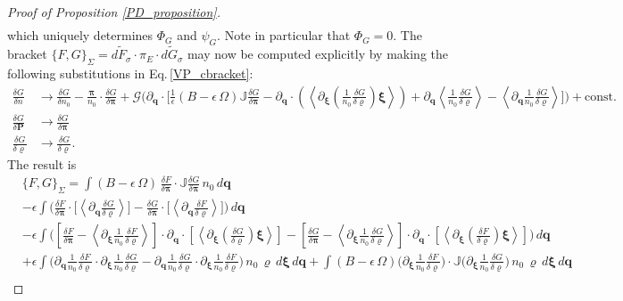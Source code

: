 \documentclass[10pt,a4paper]{amsart}
\begin{document}
\begin{proof}[Proof of Proposition \ref{PD_proposition}]
\begin{align*}
\end{align*}
which uniquely determines $\Phi_G$ and $\psi_G$. Note in particular that $\Phi_G = 0$. The bracket $\{F,G\}_\Sigma = \widetilde{dF_\sigma}\cdot\pi_E\cdot\widetilde{dG_\sigma}$ may now be computed explicitly by making the following substitutions in Eq.\,\eqref{VP_cbracket}:
\begin{align*}
\frac{\delta G}{\delta n}&\rightarrow \frac{\delta G}{\delta n_0} -\frac{\bm{\pi}}{n_0}\cdot\frac{\delta G}{\delta\bm{\pi}} + \mathcal{G}\bigg(\partial_{\bm{q}}\cdot\bigg[\frac{1}{\epsilon}(B-\epsilon\,\Omega)\mathbb{J}\frac{\delta G}{\delta\bm{\pi}} - \partial_{\bm{q}}\cdot\left(\left\langle\partial_{\bm{\xi}}\left(\frac{1}{n_0}\frac{\delta G}{\delta\varrho}\right)\bm{\xi}\right\rangle\right) + \partial_{\bm{q}}\left\langle\frac{1}{n_0}\frac{\delta G}{\delta \varrho}\right\rangle - \left\langle\partial_{\bm{q}}\frac{1}{n_0}\frac{\delta G}{\delta\varrho}\right\rangle\bigg]\bigg)+\text{const.}\\
\frac{\delta G}{\delta\bm{P}}&\rightarrow \frac{\delta G}{\delta\bm{\pi}}\\
\frac{\delta G}{\delta\varrho} & \rightarrow\frac{\delta G}{\delta\varrho}.
\end{align*}
The result is
\begin{align}
&\{F,G\}_{\Sigma} = \int (B-\epsilon\,\Omega)\,\frac{\delta F}{\delta\bm{\pi}}\cdot \mathbb{J}\frac{\delta G}{\delta\bm{\pi}} \,n_0\,d\bm{q} \nonumber\\
%
&-\epsilon\int\bigg(\frac{\delta F}{\delta\bm{\pi}}\cdot \bigg[    \left\langle\partial_{\bm{q}}\frac{\delta G}{\delta\varrho}\right\rangle\bigg]-\frac{\delta G}{\delta\bm{\pi}}\cdot \bigg[  \left\langle\partial_{\bm{q}}\frac{\delta F}{\delta\varrho}\right\rangle\bigg]\bigg)\,d\bm{q}\nonumber\\
&- \epsilon \int \bigg(\left[\frac{\delta F}{\delta\bm{\pi}} - \left\langle\partial_{\bm{\xi}}\frac{1}{n_0}\frac{\delta F}{\delta\varrho}\right\rangle\right]\cdot\partial_{\bm{q}}\cdot\left[\left\langle\partial_{\bm{\xi}}\left(\frac{\delta G}{\delta\varrho}\right)\bm{\xi}\right\rangle\right] -\left[\frac{\delta G}{\delta\bm{\pi}} - \left\langle\partial_{\bm{\xi}}\frac{1}{n_0}\frac{\delta G}{\delta\varrho}\right\rangle\right]\cdot\partial_{\bm{q}}\cdot\left[\left\langle\partial_{\bm{\xi}}\left(\frac{\delta F}{\delta\varrho}\right)\bm{\xi}\right\rangle\right] \bigg)\,d\bm{q}\nonumber\\
&+\epsilon\int \bigg(\partial_{\bm{q}}\frac{1}{n_0}\frac{\delta F}{\delta \varrho}\cdot \partial_{\bm{\xi}}\frac{1}{n_0}\frac{\delta G}{\delta\varrho} -\partial_{\bm{q}}\frac{1}{n_0}\frac{\delta G}{\delta \varrho}\cdot \partial_{\bm{\xi}}\frac{1}{n_0}\frac{\delta F}{\delta\varrho} \bigg)\,n_0\,\varrho\,d\bm{\xi}\,d\bm{q} + \int (B-\epsilon\,\Omega)\bigg(\partial_{\bm{\xi}}\frac{1}{n_0}\frac{\delta F}{\delta\varrho}\bigg)\cdot\mathbb{J}\bigg(\partial_{\bm{\xi}}\frac{1}{n_0}\frac{\delta G}{\delta\varrho}\bigg)\,n_0\,\varrho\,d\bm{\xi}\,d\bm{q}\nonumber\\

\end{align}
\end{proof}
\end{document}
